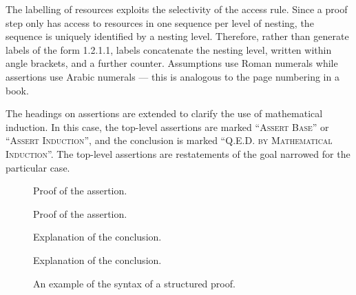 \documentclass[11pt,a4paper,oneside,titlepage]{alb-corp}
\begin{document}
The labelling of resources exploits the selectivity of the access rule.
Since a proof step only has access to resources in one sequence per
level of nesting, the sequence is uniquely identified by a nesting
level.  Therefore, rather than generate labels of the form 1.2.1.1,
labels concatenate the nesting level, written within angle brackets, and
a further counter.  Assumptions use Roman numerals while assertions use
Arabic numerals --- this is analogous to the page numbering in a book.

The headings on assertions are extended to clarify the use of
mathematical induction.  In this case, the top-level assertions are
marked ``\textsc{Assert Base}'' or ``\textsc{Assert Induction}'', and
the conclusion is marked ``\textsc{Q.E.D. by Mathematical Induction}''.
The top-level assertions are restatements of the goal narrowed for the
particular case.

\begin{figure}
  \begin{albProof}
    \begin{albAssumptions}
    \item \label{as:intr:1} %

    \item \label{as:intr:2} %
    \end{albAssumptions}

    \begin{albAssertions}
    \item \label{pf:intr:1} %

      Proof of the assertion.

    \item \label{pf:intr:2} %

      \begin{albAssumptions}
      \item \label{as:intr:3} %
      \end{albAssumptions}

      \begin{albAssertions}
      \item \label{pf:intr:3} %

        Proof of the assertion.

      \item %
        \albQED{}

        Explanation of the conclusion.
      \end{albAssertions}

    \item %
      \albQED{}

      Explanation of the conclusion.
    \end{albAssertions}
  \end{albProof}
  \caption[An example of the syntax of a structured proof]{%
    An example of the syntax of a structured proof.}
  \label{fig:alb-proofs-documentation:example-syntax-struct-pro}
\end{figure}
\end{document}
